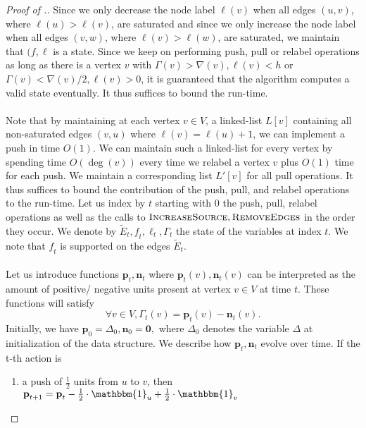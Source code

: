 \documentclass[11pt]{article}
\newcommand\bell{\boldsymbol{\mathit{\ell}}}
\newcommand\ff{\boldsymbol{\mathit{f}}}
\begin{document}
\begin{proof}[Proof of .]
Since we only decrease the node label $\bell(v)$ when all edges $(u,v)$, where $\bell(u) > \bell(v)$, are saturated and since we only increase the node label when all edges $(v,w)$, where $\bell(v) > \bell(w)$, are saturated, we maintain that $(\ff,\bell$ is a state. Since we keep on performing push, pull or relabel operations as long as there is a vertex $v$ with $\Gamma(v) > \nabla(v), \bell(v) < h$ or $\Gamma(v) < \nabla(v)/2, \bell(v) > 0$, it is guaranteed that the algorithm computes a valid state eventually. It thus suffices to bound the run-time. \\
\\
Note that by maintaining at each vertex $v \in V$, a linked-list $L[v]$ containing all non-saturated edges $(v,u)$ where $\bell(v) = \bell(u) + 1$, we can implement a push in time $O(1)$. We can maintain such a linked-list for every vertex by spending time $O(\deg(v))$ every time we relabel a vertex $v$ plus $O(1)$ time for each push. We maintain a corresponding list $L'[v]$ for all pull operations. It thus suffices to bound the contribution of the push, pull, and relabel operations to the run-time. Let us index by $t$ starting with $0$ the push, pull, relabel operations as well as the calls to $\textsc{IncreaseSource}, \textsc{RemoveEdges}$ in the order they occur. We denote by $\tilde{E}_t, \ff_t, \bell_t, \Gamma_t$ the state of the variables at index $t$. We note that $\ff_t$ is supported on the edges $\tilde{E}_t$. \\
\\
Let us introduce functions $\textbf{p}_t, \textbf{n}_t$ where $\textbf{p}_t(v), \textbf{n}_t(v)$ can be interpreted as the amount of positive/ negative units present at vertex $v \in V$ at time $t$. These functions will satisfy 
\begin{equation}\label{eq:sum-of-protons-electrons}
    \forall v \in V, \Gamma_t(v) = \textbf{p}_t(v) - \textbf{n}_t(v).
\end{equation}
Initially, we have $\textbf{p}_0 = \Delta_0, \textbf{n}_0 = \boldsymbol{0},$ where $\Delta_0$ denotes the variable $\Delta$ at initialization of the data structure. We describe how $\textbf{p}_t, \textbf{n}_t$ evolve over time. If the t-th action is 
\begin{enumerate}
    \item a push of $\frac{1}{2}$ units from $u$ to $v$, then $\textbf{p}_{t+1} = \textbf{p}_t - \frac{1}{2} \cdot \mathbbm{1}_u + \frac{1}{2} \cdot \mathbbm{1}_v$

\end{enumerate}
\end{proof}
\end{document}
